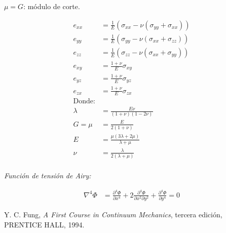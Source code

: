 \documentclass[a4paper,10pt,twoside,final,spanish]{article}
\begin{document}
\begin{enumerate}[1.]
\begin{minipage}[t]{0.5\linewidth}
$\mu=G$: módulo de corte. \\

\end{minipage} \hfill \begin{minipage}[t]{0.5\linewidth}

\begin{align*}
e_{xx} &= \frac{1}{E}(\sigma_{xx}-\nu(\sigma_{yy}+\sigma_{xx})) \\
e_{yy} &= \frac{1}{E}(\sigma_{yy}-\nu(\sigma_{xx}+\sigma_{zz})) \\
e_{zz} &= \frac{1}{E}(\sigma_{zz}-\nu(\sigma_{xx}+\sigma_{yy})) \\
e_{xy} &= \frac{1+\nu}{E}\sigma_{xy} \\
e_{yz} &= \frac{1+\nu}{E}\sigma_{yz} \\
e_{zx} &= \frac{1+\nu}{E}\sigma_{zx} \\
\mbox{Donde:} \\
\lambda &= \frac{E\nu}{(1+\nu)(1-2\nu)}           \\
G=\mu   &= \frac{E}{2(1+\nu)}                     \\
E       &= \frac{\mu(3\lambda+2\mu)}{\lambda+\mu} \\
\nu     &= \frac{\lambda}{2(\lambda+\mu)}         \\
\end{align*}

\end{minipage}

\end{enumerate}

\textit{Función de tensión de Airy:}

\begin{align*}
\nabla^{4}\Phi &= \frac{\partial^{4}\Phi}{\partial x^{4}}
+2\frac{\partial^{4}\Phi}{\partial x^{2} \partial y^{2}}
+\frac{\partial^{4}\Phi}{\partial y^{4}}=0
\end{align*}

\begin{thebibliography}{99}
Y. C. Fung,
\emph{A First Course in Continuum Mechanics}, 
tercera edición,
PRENTICE HALL,
1994.
\end{thebibliography}
\end{document}
